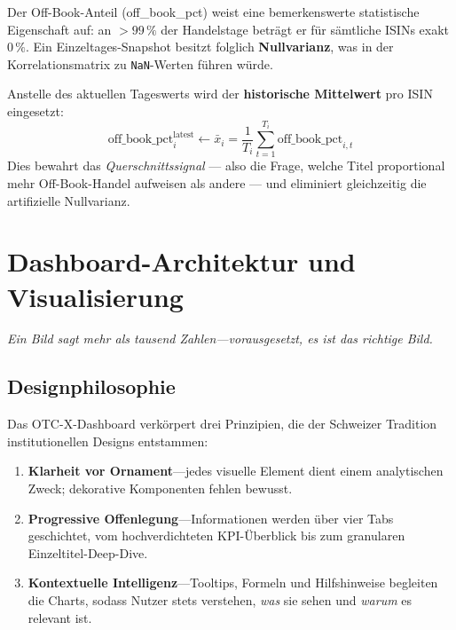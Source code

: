 \documentclass[11pt, a4paper, oneside, openany]{report}
\newcommand{\metr}[1]{{\datafont\footnotesize\textcolor{MetricBlue}{#1}}}
\begin{document}
Der Off-Book-Anteil (\metr{off\_book\_pct}) weist eine bemerkenswerte statistische Eigenschaft auf: an $> 99\,\%$ der Handelstage beträgt er für sämtliche ISINs exakt $0\,\%$. Ein Einzeltages-Snapshot besitzt folglich \textbf{Nullvarianz}, was in der Korrelationsmatrix zu \texttt{NaN}-Werten führen würde.

\begin{mathbox}
Anstelle des aktuellen Tageswerts wird der \textbf{historische Mittelwert} pro ISIN eingesetzt:
\[
  \text{off\_book\_pct}_i^{\text{latest}} \leftarrow \bar{x}_i = \frac{1}{T_i}\sum_{t=1}^{T_i} \text{off\_book\_pct}_{i,t}
\]
Dies bewahrt das \textit{Querschnittssignal} --- also die Frage, welche Titel proportional mehr Off-Book-Handel aufweisen als andere --- und eliminiert gleichzeitig die artifizielle Nullvarianz.
\end{mathbox}


\chapter{Dashboard-Architektur und Visualisierung}
\label{ch:dashboard}

\epigraph{\itshape Ein Bild sagt mehr als tausend Zahlen\;---\;vorausgesetzt, es ist das richtige Bild.}{}

\section{Designphilosophie}

Das OTC-X-Dashboard verkörpert drei Prinzipien, die der Schweizer Tradition institutionellen Designs entstammen:

\begin{enumerate}[label=\textcolor{SwissRed}{\textbf{\arabic*.}}]
  \item \textbf{Klarheit vor Ornament}\;---\;jedes visuelle Element dient einem analytischen Zweck; dekorative Komponenten fehlen bewusst.
  \item \textbf{Progressive Offenlegung}\;---\;Informationen werden über vier Tabs geschichtet, vom hochverdichteten KPI-Überblick bis zum granularen Einzeltitel-Deep-Dive.
  \item \textbf{Kontextuelle Intelligenz}\;---\;Tooltips, Formeln und Hilfshinweise begleiten die Charts, sodass Nutzer stets verstehen, \emph{was} sie sehen und \emph{warum} es relevant ist.
\end{enumerate}
\end{document}
